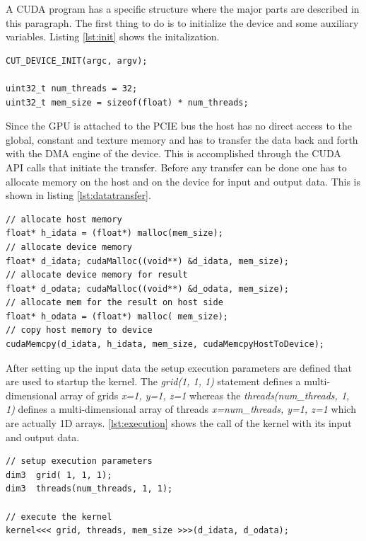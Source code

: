 A \gls{CUDA} program has a specific structure where the major parts are
described in this paragraph. The first thing to do is to initialize the device
and some auxiliary variables. Listing \autoref{lst:init} shows the
initalization.

%
\begin{lstlisting}[caption=Hardware initalization, label=lst:init]
CUT_DEVICE_INIT(argc, argv);

uint32_t num_threads = 32;
uint32_t mem_size = sizeof(float) * num_threads;				
\end{lstlisting} 
%

Since the \gls{GPU} is attached to the \gls{PCIE} bus the host has no direct
access to the global, constant and texture memory and has to transfer the data
back and forth with the \gls{DMA} engine of the device. This is accomplished
through the \gls{CUDA} \gls{API} calls that initiate the transfer. Before any
transfer can be done one has to allocate memory on the host and on the device
for input and output data. This is shown in listing \autoref{lst:datatransfer}.


\begin{lstlisting}[caption=Data transfer of data, label=lst:datatransfer]
// allocate host memory 
float* h_idata = (float*) malloc(mem_size);
// allocate device memory 
float* d_idata; cudaMalloc((void**) &d_idata, mem_size);
// allocate device memory for result
float* d_odata; cudaMalloc((void**) &d_odata, mem_size);
// allocate mem for the result on host side
float* h_odata = (float*) malloc( mem_size);
// copy host memory to device 
cudaMemcpy(d_idata, h_idata, mem_size, cudaMemcpyHostToDevice);
\end{lstlisting} 


After setting up the input data the setup execution parameters are defined that
are used to startup the kernel. The \textit{grid(1, 1, 1)} statement defines
a multi-dimensional array of grids \textit{x=1, y=1, z=1} whereas the
\textit{threads(num\_threads, 1, 1)} defines a multi-dimensional array of
threads \textit{x=num\_threads, y=1, z=1} which are actually \gls{1D} arrays.
\autoref{lst:execution} shows the call of the kernel with its input and
output data.


\begin{lstlisting}[caption=Execution of the Kernel, label=lst:execution]
// setup execution parameters
dim3  grid( 1, 1, 1);
dim3  threads(num_threads, 1, 1);

// execute the kernel
kernel<<< grid, threads, mem_size >>>(d_idata, d_odata);
\end{lstlisting} 

